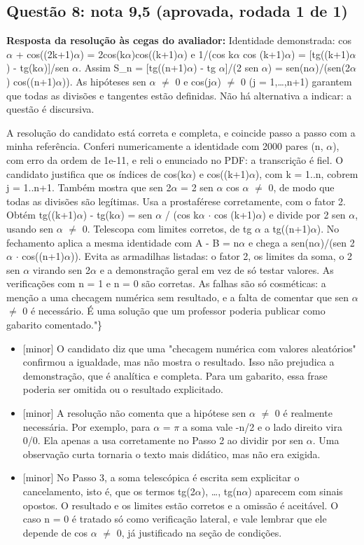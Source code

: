 \documentclass{article}%
\begin{document}
\subsection*{Questão 8: nota 9,5 (aprovada, rodada 1 de 1)}%
\textbf{Resposta da resolução às cegas do avaliador:} Identidade demonstrada: cos $\alpha$ + cos((2k+1)$\alpha$) = 2cos(k$\alpha$)cos((k+1)$\alpha$) e 1/(cos k$\alpha$ cos (k+1)$\alpha$) = {[}tg((k+1)$\alpha$) - tg(k$\alpha$){]}/sen $\alpha$. Assim S\_n = {[}tg((n+1)$\alpha$) - tg $\alpha${]}/(2 sen $\alpha$) = sen(n$\alpha$)/(sen(2$\alpha$) cos((n+1)$\alpha$)). As hipóteses sen $\alpha$ $\neq$ 0 e cos(j$\alpha$) $\neq$ 0 (j = 1,\ldots{},n+1) garantem que todas as divisões e tangentes estão definidas. Não há alternativa a indicar: a questão é discursiva.\par %
A resolução do candidato está correta e completa, e coincide passo a passo com a minha referência. Conferi numericamente a identidade com 2000 pares (n, $\alpha$), com erro da ordem de 1e{-}11, e reli o enunciado no PDF: a transcrição é fiel. O candidato justifica que os índices de cos(k$\alpha$) e cos((k+1)$\alpha$), com k = 1..n, cobrem j = 1..n+1. Também mostra que sen 2$\alpha$ = 2 sen $\alpha$ cos $\alpha$ $\neq$ 0, de modo que todas as divisões são legítimas. Usa a prostaférese corretamente, com o fator 2. Obtém tg((k+1)$\alpha$) - tg(k$\alpha$) = sen $\alpha$ / (cos k$\alpha$ $\cdot$ cos (k+1)$\alpha$) e divide por 2 sen $\alpha$, usando sen $\alpha$ $\neq$ 0. Telescopa com limites corretos, de tg $\alpha$ a tg((n+1)$\alpha$). No fechamento aplica a mesma identidade com A - B = n$\alpha$ e chega a sen(n$\alpha$)/(sen 2$\alpha$ $\cdot$ cos((n+1)$\alpha$)). Evita as armadilhas listadas: o fator 2, os limites da soma, o 2 sen $\alpha$ virando sen 2$\alpha$ e a demonstração geral em vez de só testar valores. As verificações com n = 1 e n = 0 são corretas. As falhas são só cosméticas: a menção a uma checagem numérica sem resultado, e a falta de comentar que sen $\alpha$ $\neq$ 0 é necessário. É uma solução que um professor poderia publicar como gabarito comentado."\}%
\begin{itemize}%
\item%
{[}minor{]} O candidato diz que uma "checagem numérica com valores aleatórios" confirmou a igualdade, mas não mostra o resultado. Isso não prejudica a demonstração, que é analítica e completa. Para um gabarito, essa frase poderia ser omitida ou o resultado explicitado.%
\item%
{[}minor{]} A resolução não comenta que a hipótese sen $\alpha$ $\neq$ 0 é realmente necessária. Por exemplo, para $\alpha$ = $\pi$ a soma vale -n/2 e o lado direito vira 0/0. Ela apenas a usa corretamente no Passo 2 ao dividir por sen $\alpha$. Uma observação curta tornaria o texto mais didático, mas não era exigida.%
\item%
{[}minor{]} No Passo 3, a soma telescópica é escrita sem explicitar o cancelamento, isto é, que os termos tg(2$\alpha$), \ldots{}, tg(n$\alpha$) aparecem com sinais opostos. O resultado e os limites estão corretos e a omissão é aceitável. O caso n = 0 é tratado só como verificação lateral, e vale lembrar que ele depende de cos $\alpha$ $\neq$ 0, já justificado na seção de condições.%
\end{itemize}%
\end{document}
